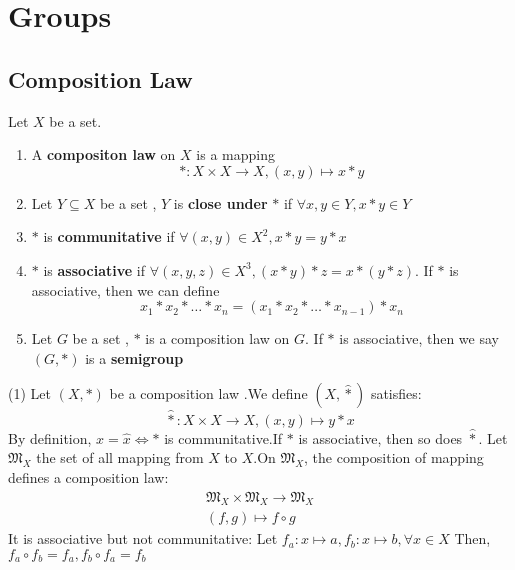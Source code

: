 \chapter{Groups}

\section{Composition Law}
\begin{definitionenv}
    Let $X$ be a set.
    \begin{enumerate}[ (i)]
        \item A \textbf{compositon law} on $X$ is a mapping
        $$*:X\times X\rightarrow X, (x, y)\mapsto x * y$$
        \item Let $Y\subseteq X$ be a set ,  $Y$ is \textbf{close under } $*$ if $\forall x, y \in Y,  x*y\in Y$
        \item $*$ is \textbf{communitative} if $\forall (x, y)\in X^2, x*y=y*x$
        \item $*$ is \textbf{associative} if $\forall (x, y, z)\in X^3, (x*y)*z=x*(y*z)$.
        If $*$ is associative,  then we can define
    $$x_1*x_2*\dots *x_n=(x_1*x_2*\dots *x_{n-1})*x_n$$
    \item Let $G$ be a set ,  $*$ is a composition law on $G$. If $*$ is associative, then we say $(G, *)$ is a \textbf{semigroup}
    \end{enumerate}
    
    

\end{definitionenv}
\begin{exampleenv}
    \quad
    \newline
    (1) Let $(X, *)$ be a composition law .We define $(X, \hat{*})$ satisfies:
    $$\hat{*}:X\times X\rightarrow X,  (x, y)\mapsto y*x$$
    By definition, $x=\hat{x}\Leftrightarrow *$ is communitative.If $*$ is associative,  then so does $\hat{*}$.
    Let $\mathfrak{M} _X$ the set of all mapping from $X$ to $X$.On $\mathfrak{M} _X$, the composition of mapping defines a composition law:
    $$\begin{matrix}
\mathfrak{M} _X\times \mathfrak{M} _X\rightarrow\mathfrak{M} _X \\
(f, g)\mapsto f\circ g

\end{matrix}$$
It is associative but not communitative:
\newline
Let $f_a:x\mapsto a , f_b:x\mapsto b , \forall x\in X$ Then,  $f_a\circ f_b=f_a, f_b\circ f_a=f_b$
\end{exampleenv}

